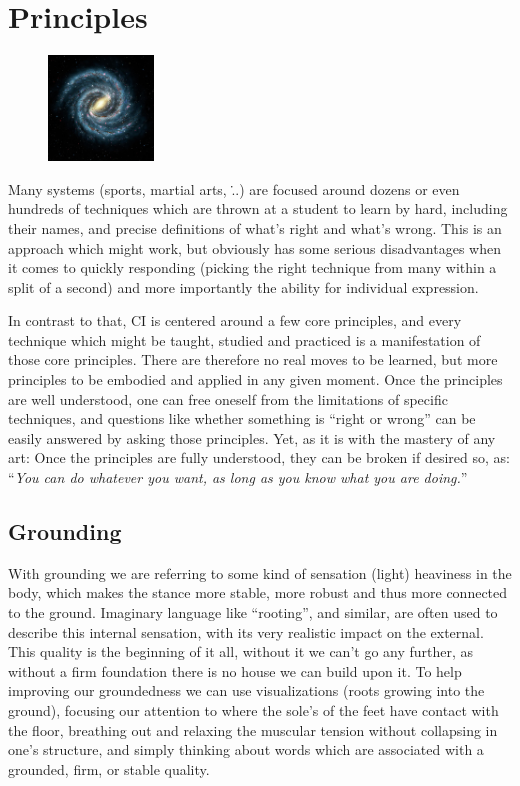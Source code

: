 \section{Principles}\label{sec:principles}

\begin{figure}
\centering
\includegraphics[width=0.25\textwidth]{images/principles}
\end{figure}

Many systems (sports, martial arts, \...) are focused around dozens or even hundreds of techniques which are thrown at a student to learn by hard, including their names, and precise definitions of what's right and what's wrong.
This is an approach which might work, but obviously has some serious disadvantages when it comes to quickly responding (picking the right technique from many within a split of a second) and more importantly the ability for individual expression.

In contrast to that, CI is centered around a few core principles, and every technique which might be taught, studied and practiced is a manifestation of those core principles.
There are therefore no real moves to be learned, but more principles to be embodied and applied in any given moment.
Once the principles are well understood, one can free oneself from the limitations of specific techniques, and questions like whether something is ``right or wrong'' can be easily answered by asking those principles.
Yet, as it is with the mastery of any art: Once the principles are fully understood, they can be broken if desired so, as: ``\textit{You can do whatever you want, as long as you know what you are doing.}''

\subsection{Grounding}\label{subsec:grounding}

With grounding we are referring to some kind of sensation (light) heaviness in the body, which makes the stance more stable, more robust and thus more connected to the ground.
Imaginary language like ``rooting'', and similar, are often used to describe this internal sensation, with its very realistic impact on the external.
This quality is the beginning of it all, without it we can't go any further, as without a firm foundation there is no house we can build upon it.
To help improving our groundedness we can use visualizations (roots growing into the ground), focusing our attention to where the sole's of the feet have contact with the floor, breathing out and relaxing the muscular tension without collapsing in one's structure, and simply thinking about words which are associated with a grounded, firm, or stable quality.

